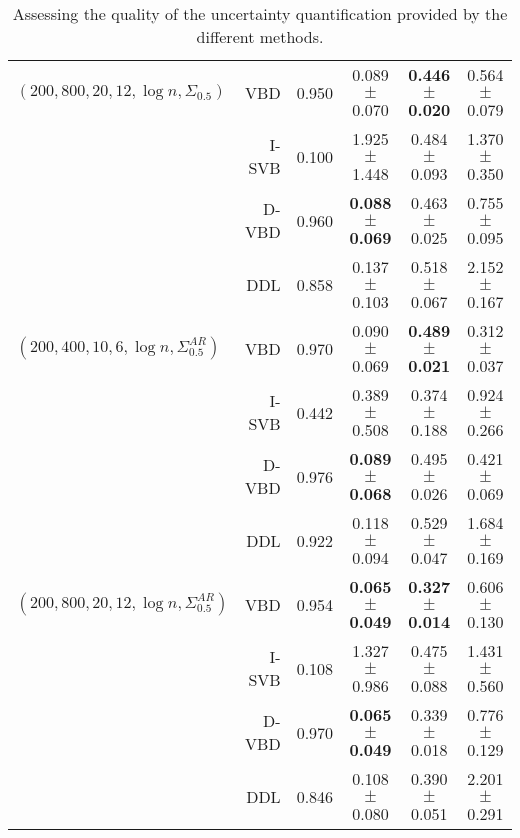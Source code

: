 \documentclass[11pt]{article}
\numberwithin{equation}{section}
\begin{document}
\begin{table}
{\begin{tabular}{l|r|c|ccc}
                                                    \hline
$(200 , 800 , 20 , 12 , \log n, \Sigma_{0.5})$      & VBD    & 0.950 & 0.089  $\pm$  0.070          & \textbf{0.446  $\pm$  0.020} & 0.564  $\pm$  0.079\\
                                                    & I-SVB  & 0.100 & 1.925  $\pm$  1.448          & 0.484  $\pm$  0.093 & 1.370  $\pm$  0.350\\
                                                    & D-VBD & 0.960 & \textbf{0.088  $\pm$  0.069} & 0.463  $\pm$  0.025 & 0.755  $\pm$  0.095\\
                                                    & DDL    & 0.858 & 0.137  $\pm$  0.103          & 0.518  $\pm$  0.067 & 2.152  $\pm$  0.167\\
                                                    \hline
$(200 , 400 , 10 , 6 , \log n, \Sigma^{AR}_{0.5})$ & VBD    & 0.970 & 0.090  $\pm$  0.069          & \textbf{0.489  $\pm$  0.021} & 0.312  $\pm$  0.037\\
                                                    & I-SVB  & 0.442 & 0.389  $\pm$  0.508          & 0.374  $\pm$  0.188 & 0.924  $\pm$  0.266\\
                                                    & D-VBD & 0.976 & \textbf{0.089  $\pm$  0.068} & 0.495  $\pm$  0.026 & 0.421  $\pm$  0.069\\
                                                    & DDL    & 0.922 & 0.118  $\pm$  0.094          & 0.529  $\pm$  0.047 & 1.684  $\pm$  0.169\\
                                                    \hline
$(200 , 800 , 20 , 12 , \log n, \Sigma^{AR}_{0.5})$ & VBD    & 0.954 & \textbf{0.065  $\pm$  0.049} & \textbf{0.327  $\pm$  0.014} & 0.606  $\pm$  0.130\\
                                                    & I-SVB  & 0.108 & 1.327  $\pm$  0.986          & 0.475  $\pm$  0.088 & 1.431  $\pm$  0.560\\
                                                    & D-VBD & 0.970 & \textbf{0.065  $\pm$  0.049} & 0.339  $\pm$  0.018 & 0.776  $\pm$  0.129\\
                                                    & DDL    & 0.846 & 0.108  $\pm$  0.080          & 0.390  $\pm$  0.051 & 2.201  $\pm$  0.291\\
\bottomrule
\end{tabular}
}
\caption{Assessing the quality of the uncertainty quantification provided by the different methods.}
\label{Tab:double_debiasing_results}
\end{table}
\end{document}
